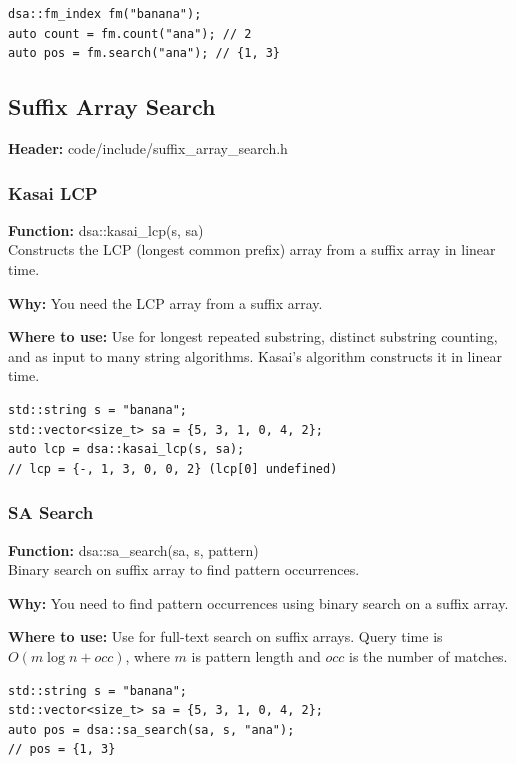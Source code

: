 \documentclass[11pt]{article}
\begin{document}
\begin{lstlisting}
dsa::fm_index fm("banana");
auto count = fm.count("ana"); // 2
auto pos = fm.search("ana"); // {1, 3}
\end{lstlisting}

\subsection{Suffix Array Search}
\textbf{Header:} code/include/suffix\_array\_search.h

\subsubsection{Kasai LCP}
\textbf{Function:} dsa::kasai\_lcp(s, sa)\\

Constructs the LCP (longest common prefix) array from a suffix array in linear time.

\textbf{Why:} You need the LCP array from a suffix array. \par \textbf{Where to use:} Use for longest repeated substring, distinct substring counting, and as input to many string algorithms. Kasai's algorithm constructs it in linear time.

\begin{lstlisting}
std::string s = "banana";
std::vector<size_t> sa = {5, 3, 1, 0, 4, 2};
auto lcp = dsa::kasai_lcp(s, sa);
// lcp = {-, 1, 3, 0, 0, 2} (lcp[0] undefined)
\end{lstlisting}

\subsubsection{SA Search}
\textbf{Function:} dsa::sa\_search(sa, s, pattern)\\

Binary search on suffix array to find pattern occurrences.

\textbf{Why:} You need to find pattern occurrences using binary search on a suffix array. \par \textbf{Where to use:} Use for full-text search on suffix arrays. Query time is \(O(m\log n + occ)\), where \(m\) is pattern length and \(occ\) is the number of matches.

\begin{lstlisting}
std::string s = "banana";
std::vector<size_t> sa = {5, 3, 1, 0, 4, 2};
auto pos = dsa::sa_search(sa, s, "ana");
// pos = {1, 3}
\end{lstlisting}
\end{document}
